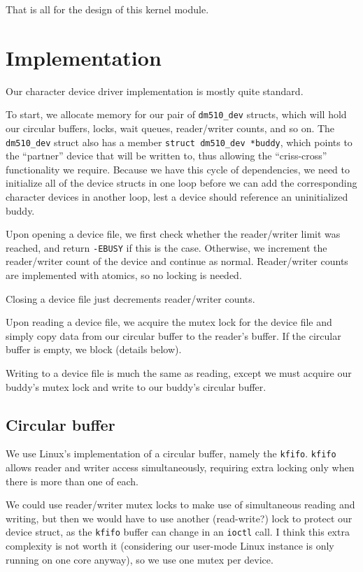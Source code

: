 \documentclass{report}
\begin{document}
That is all for the design of this kernel module.

\section*{Implementation}

Our character device driver implementation is mostly quite standard.

To start, we allocate memory for our pair of \texttt{dm510_dev} structs,
which will hold our circular buffers, locks, wait queues, reader/writer counts, and so on.
The \texttt{dm510_dev} struct also has a member \texttt{struct dm510_dev *buddy},
which points to the ``partner'' device that will be written to,
thus allowing the ``criss-cross'' functionality we require.
Because we have this cycle of dependencies,
we need to initialize all of the device structs in one loop before we can add the corresponding character devices in another loop,
lest a device should reference an uninitialized buddy.

Upon opening a device file, we first check whether the reader/writer limit was reached,
and return \texttt{-EBUSY} if this is the case.
Otherwise, we increment the reader/writer count of the device and continue as normal.
Reader/writer counts are implemented with atomics, so no locking is needed.

Closing a device file just decrements reader/writer counts.

Upon reading a device file, we acquire the mutex lock for the device file
and simply copy data from our circular buffer to the reader's buffer.
If the circular buffer is empty, we block (details below).

Writing to a device file is much the same as reading,
except we must acquire our buddy's mutex lock
and write to our buddy's circular buffer.

\subsection*{Circular buffer}

We use Linux's implementation of a circular buffer, namely the \texttt{kfifo}.
\texttt{kfifo} allows reader and writer access simultaneously,
requiring extra locking only when there is more than one of each.

We could use reader/writer mutex locks to make use of simultaneous reading and writing,
but then we would have to use another (read-write?) lock to protect our device struct,
as the \texttt{kfifo} buffer can change in an \texttt{ioctl} call.
I think this extra complexity is not worth it
(considering our user-mode Linux instance is only running on one core anyway),
so we use one mutex per device.
\end{document}
